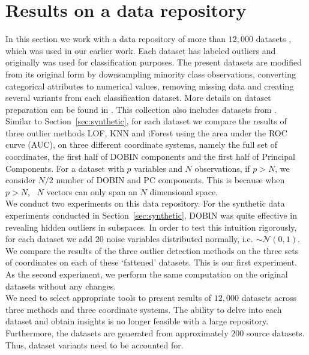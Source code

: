 \documentclass[11pt]{article}
\begin{document}
\section{Results on a data repository}\label{sec:DatRepo}
In this section we work with a data repository of more than $12,000$ datasets \citep{datasets}, which was used in our earlier work. Each dataset has labeled outliers and  originally was used for classification purposes. The present datasets are modified from its original form by downsampling minority class observations, converting categorical attributes to numerical values, removing missing data and creating several variants from each classification dataset. More details on dataset preparation can be found in \cite{kandanaarachchi2018normalization}. This collection also includes datasets from \cite{campos2016evaluation}. \\ 

Similar to Section~\ref{sec:synthetic}, for each dataset we compare the results of three outlier methods LOF, KNN and iForest using the area under the ROC curve (AUC), on three different coordinate systems, namely the full set of coordinates, the first half of DOBIN components and the first half of Principal Components. For a dataset with $p$ variables and $N$ observations, if $p > N$, we consider $N/2$ number of DOBIN and PC components. This is because when $p >N$, \,  $N$  vectors can only span an $N$ dimensional space.  \\

We conduct two experiments on this data repository. For the synthetic data experiments conducted in Section~\ref{sec:synthetic}, DOBIN was quite effective in revealing hidden outliers in subspaces. In order to test this intuition rigorously, for each dataset we add $20$ noise variables distributed normally, i.e. $\sim \mathcal{N}(0,1)$.  We compare the results of the three outlier detection methods on the three sets of coordinates on each of these `fattened' datasets. This is our first experiment. As the second experiment, we perform the same computation on the original datasets without any changes. \\

We need to select appropriate tools to present results of $12,000$ datasets across three methods and three coordinate systems. The ability to delve into each dataset and obtain  insights is no longer feasible with a large repository. Furthermore, the datasets are generated from approximately $200$ source datasets. Thus, dataset variants need to be accounted for. \\
\end{document}

